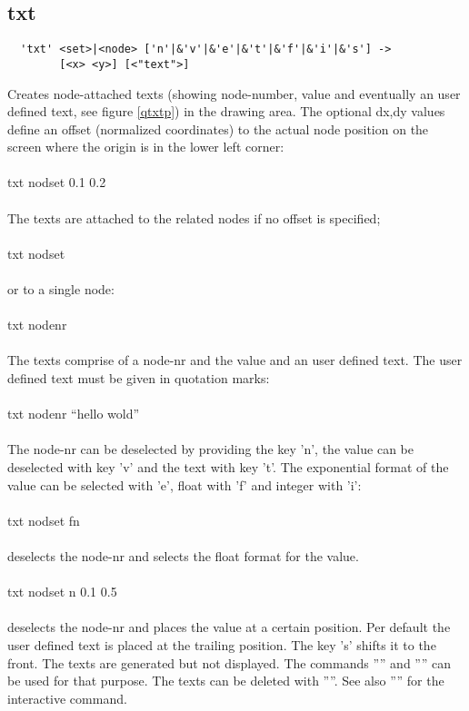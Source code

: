 \documentclass{article}
\begin{document}
\subsection{\label{txt}txt}
\begin{verbatim}
  'txt' <set>|<node> ['n'|&'v'|&'e'|&'t'|&'f'|&'i'|&'s'] ->
        [<x> <y>] [<"text">]
\end{verbatim}
Creates node-attached texts (showing node-number, value and eventually an user defined text, see figure
\ref{qtxtp}) in the drawing area. The optional dx,dy values define an offset (normalized coordinates) to the actual node position on the screen where the origin is in the lower left corner:\\\\txt nodset 0.1 0.2\\\\
The texts are attached to the related nodes if no offset is specified;\\\\txt nodset\\\\or to a single node:\\\\txt nodenr\\\\
The texts comprise of a node-nr and the value and an user defined text. The user defined text must be given in quotation marks:\\\\txt nodenr ``hello wold''\\\\
The node-nr can be deselected by providing the key 'n', the value can be deselected with key 'v' and the text with key 't'. The exponential format of the value can be selected with 'e', float with 'f' and integer with 'i':\\\\txt nodset fn\\\\deselects the node-nr and selects the float format for the value.\\\\txt nodset n 0.1 0.5\\\\deselects the node-nr and places the value at a certain position. Per default the user defined text is placed at the trailing position. The key 's' shifts it to the front.
The texts are generated but not displayed. The commands '''' and '''' can be used for that purpose. The texts can be deleted with ''''. See also '''' for the interactive command.
\end{document}
